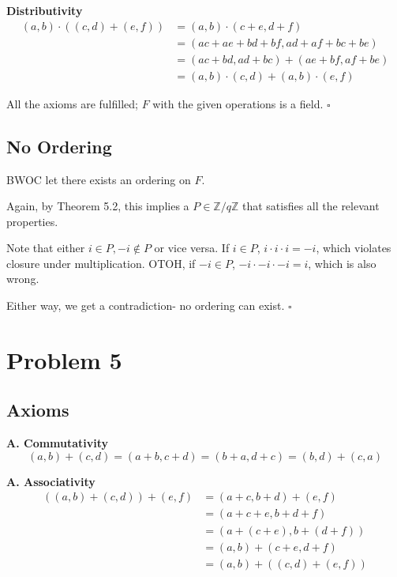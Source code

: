 \documentclass[12pt]{article}
\begin{document}
\textbf{Distributivity}
\begin{align*}
      (a,b) \cdot ((c,d)+(e,f))
       & = (a,b) \cdot (c+e,d+f)                 \\
       & = (ac+ae+bd+bf, ad+af+bc+be)            \\
       & = (ac+bd, ad+bc)+(ae+bf, af+be)         \\
       & = (a,b) \cdot (c,d) + (a,b) \cdot (e,f)
\end{align*}

All the axioms are fulfilled; $F$ with the given operations is a field. $\square$

\subsection{No Ordering}

BWOC let there exists an ordering on $F$.

Again, by Theorem 5.2, this implies a $P \in \mathbb{Z}/q\mathbb{Z}$
that satisfies all the relevant properties.

Note that either $i \in P, -i \notin P$ or vice versa.
If $i \in P$, $i \cdot i \cdot i=-i$, which violates closure under multiplication.
OTOH, if $-i \in P$, $-i \cdot -i \cdot -i=i$, which is also wrong.

Either way, we get a contradiction- no ordering can exist. $\square$

\pagebreak

\section{Problem 5}

\subsection{Axioms}

\textbf{A. Commutativity}
\[(a,b)+(c,d)=(a+b,c+d)=(b+a,d+c)=(b,d)+(c,a)\]

\textbf{A. Associativity}
\begin{align*}
      ((a,b)+(c,d))+(e,f)
       & = (a+c,b+d)+(e,f)     \\
       & = (a+c+e,b+d+f)       \\
       & = (a+(c+e),b+(d+f))   \\
       & = (a,b)+(c+e,d+f)     \\
       & = (a,b)+((c,d)+(e,f))
\end{align*}
\end{document}
